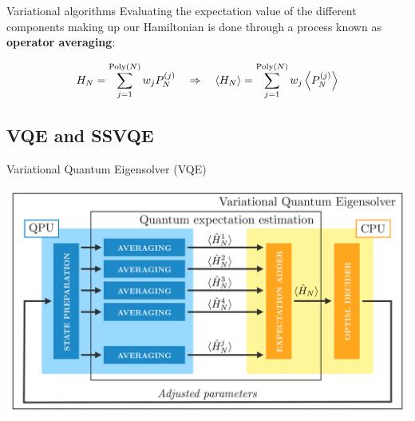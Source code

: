 \begin{frame}[allowframebreaks]{Variational algorithms}
  Evaluating the expectation value of the different components making up our Hamiltonian is done through a process known as \textbf{operator averaging}:

  \begin{gather*}
    H_{N} = \sum_{j=1}^{\text{Poly}(N)} w_{j} P_{N}^{(j)} \qRa
    \ev{H_{N}} = \sum_{j=1}^{\text{Poly}(N)} w_{j} \ev{P_{N}^{(j)}}
  \end{gather*}

\end{frame}


\subsection{VQE and SSVQE}


\begin{frame}{Variational Quantum Eigensolver (VQE)}

	\begin{center}
		\includegraphics[width=.7\paperwidth]{Figures/chapter05/VQE}
	\end{center}

\end{frame}



